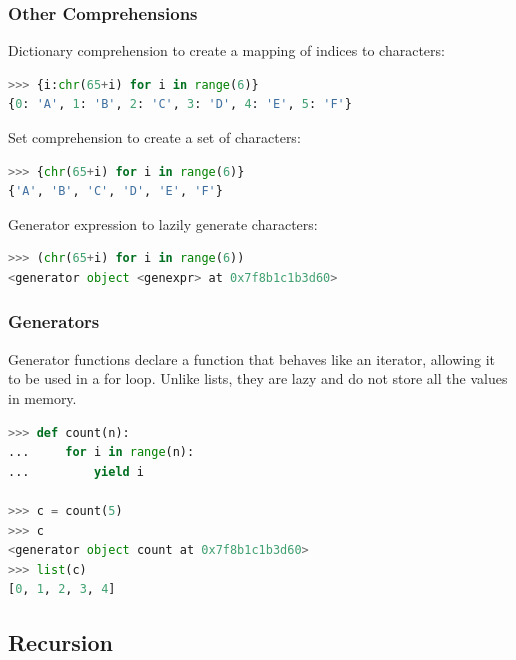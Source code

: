 \documentclass[envcountsect,10pt]{beamer}
\begin{document}
\begin{frame}[fragile]
    \frametitle{Other Comprehensions}

    Dictionary comprehension to create a mapping of indices to characters:
    \begin{lstlisting}[language=Python]
>>> {i:chr(65+i) for i in range(6)}
{0: 'A', 1: 'B', 2: 'C', 3: 'D', 4: 'E', 5: 'F'}
    \end{lstlisting}

    Set comprehension to create a set of characters:
    \begin{lstlisting}[language=Python]
>>> {chr(65+i) for i in range(6)}
{'A', 'B', 'C', 'D', 'E', 'F'}
    \end{lstlisting}

    Generator expression to lazily generate characters:
    \begin{lstlisting}[language=Python]
>>> (chr(65+i) for i in range(6))
<generator object <genexpr> at 0x7f8b1c1b3d60>
    \end{lstlisting}
\end{frame}

\begin{frame}[fragile]
    \frametitle{Generators}

    Generator functions declare a function that behaves like an iterator, allowing it to be used in a for loop. 
    Unlike lists, they are lazy and do not store all the values in memory.

    \begin{lstlisting}[language=Python]
>>> def count(n):
...     for i in range(n):
...         yield i

>>> c = count(5)
>>> c
<generator object count at 0x7f8b1c1b3d60>
>>> list(c)
[0, 1, 2, 3, 4]
    \end{lstlisting}

\end{frame}

\subsection{Recursion}
\end{document}
